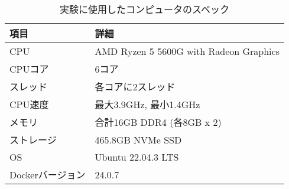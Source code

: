 \documentclass[../../../../main]{subfiles}
\begin{document}
    \begin{table}[htbp]
        \centering
        \caption{実験に使用したコンピュータのスペック}
        \label{tab:computer-specs}
        \begin{tabular}{|l|l|}
            \hline
            \textbf{項目} & \textbf{詳細}                            \\ \hline
            CPU         & AMD Ryzen 5 5600G with Radeon Graphics \\ \hline
            CPUコア       & 6コア                                    \\ \hline
            スレッド        & 各コアに2スレッド                              \\ \hline
            CPU速度       & 最大3.9GHz, 最小1.4GHz                      \\ \hline
            メモリ         & 合計16GB DDR4 (各8GB x 2)                 \\ \hline
            ストレージ       & 465.8GB NVMe SSD                       \\ \hline
            OS          & Ubuntu 22.04.3 LTS                     \\ \hline
            Dockerバージョン & 24.0.7                                 \\ \hline
        \end{tabular}
    \end{table}
\end{document}
